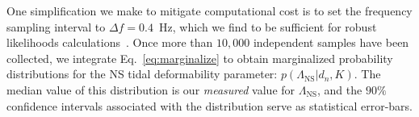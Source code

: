\documentclass[aps,prd,amsmath,floats,floatfix, twocolumn,
superscriptaddress,nofootinbib,showpacs]{revtex4-1}
\newcommand{\D}{\mathrm{d}}
\newcommand{\lambdans}{\Lambda_\mathrm{NS}}
\newcommand{\LL}{\mathcal{L}}
\begin{document}
% 
% 
% 
% 
One simplification we make to mitigate computational cost is to set the
frequency sampling interval to $\Delta f=0.4$~Hz, which we find to be
sufficient for robust likelihoods calculations~\cite{Purrer:2015nkh}.
Once more than $10,000$ independent samples have been collected, we integrate
Eq.~\ref{eq:marginalize} to obtain marginalized probability distributions
for the NS tidal deformability parameter: $p(\lambdans|d_n,K)$.
The median value of this distribution is our {\it measured} value for
$\lambdans$, and the $90\%$ confidence intervals associated with the distribution
serve as statistical error-bars.
% 




\end{document}
